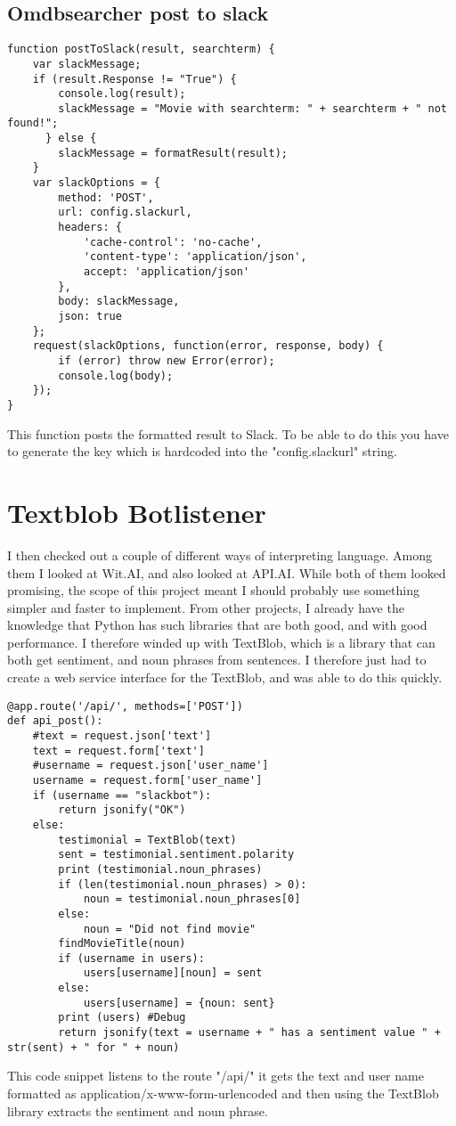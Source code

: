 \documentclass[11pt,fleqn]{book} %
\begin{document}
\subsection{Omdbsearcher post to slack}
\begin{verbatim}
function postToSlack(result, searchterm) {
    var slackMessage;
    if (result.Response != "True") {
        console.log(result);
        slackMessage = "Movie with searchterm: " + searchterm + " not found!";
      } else {
        slackMessage = formatResult(result);
    }
    var slackOptions = {
        method: 'POST',
        url: config.slackurl,
        headers: {
            'cache-control': 'no-cache',
            'content-type': 'application/json',
            accept: 'application/json'
        },
        body: slackMessage,
        json: true
    };
    request(slackOptions, function(error, response, body) {
        if (error) throw new Error(error);
        console.log(body);
    });
}
\end{verbatim}
This function posts the formatted result to Slack. To be able to do this you have to generate the key which is hardcoded into the "config.slackurl" string.  

\section{Textblob Botlistener}
I then checked out a couple of different ways of interpreting language. Among them I looked at Wit.AI\cite{Wit.aiWit.ai}, and also looked at API.AI\cite{API.AIConversationalAPI.AI}. While both of them looked promising, the scope of this project meant I should probably use something simpler and faster to implement. 
From other projects, I already have the knowledge that Python has such libraries that are both good, and with good performance. I therefore winded up with TextBlob, which is a library that can both get sentiment, and noun phrases\cite{WikipediaNounPhrase} from sentences. \cite{TextBlobTutorial:Documentation} 
I therefore just had to create a web service interface for the TextBlob, and was able to do this quickly.
\newpage
\begin{verbatim}
@app.route('/api/', methods=['POST'])
def api_post():
    #text = request.json['text']
    text = request.form['text']
    #username = request.json['user_name']
    username = request.form['user_name']
    if (username == "slackbot"):
        return jsonify("OK")
    else:
        testimonial = TextBlob(text)
        sent = testimonial.sentiment.polarity
        print (testimonial.noun_phrases)
        if (len(testimonial.noun_phrases) > 0):
            noun = testimonial.noun_phrases[0]
        else:
            noun = "Did not find movie"
        findMovieTitle(noun)
        if (username in users):
            users[username][noun] = sent
        else:
            users[username] = {noun: sent}
        print (users) #Debug
        return jsonify(text = username + " has a sentiment value " + str(sent) + " for " + noun)
\end{verbatim}
This code snippet listens to the route "/api/" it gets the text and user name formatted as application/x-www-form-urlencoded and then using the TextBlob library extracts the sentiment\cite{WikipediaSentimentAnalysis} and noun phrase\cite{WikipediaNounPhrase}.
\end{document}
